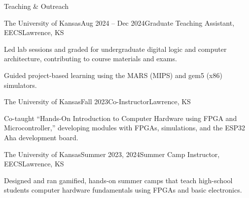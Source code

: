\begin{rSection}{Teaching \& Outreach}

\begin{rSubsection}{The University of Kansas}{Aug 2024 -- Dec 2024}{Graduate Teaching Assistant, EECS}{Lawrence, KS}
\item Led lab sessions and graded for undergraduate digital logic and computer architecture, contributing to course materials and exams.
\item Guided project-based learning using the MARS (MIPS) and gem5 (x86) simulators.
\end{rSubsection}

\begin{rSubsection}{The University of Kansas}{Fall 2023}{Co-Instructor}{Lawrence, KS}
\item Co-taught ``Hands-On Introduction to Computer Hardware using FPGA and Microcontroller,'' developing modules with FPGAs, simulations, and the ESP32 Aha development board.
\end{rSubsection}

\begin{rSubsection}{The University of Kansas}{Summer 2023, 2024}{Summer Camp Instructor, EECS}{Lawrence, KS}
\item Designed and ran gamified, hands-on summer camps that teach high-school students computer hardware fundamentals using FPGAs and basic electronics.
\end{rSubsection}

\end{rSection}
